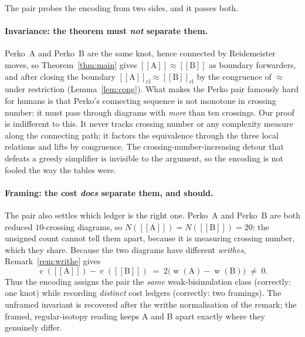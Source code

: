 \documentclass[11pt]{article}
\theoremstyle{definition}
\newcommand{\enc}[1]{[\![ #1 ]\!]}
\newcommand{\wbisim}{\approx}
\newcommand{\writhe}{\operatorname{w}}
\newcommand{\cost}{\operatorname{c}}
\begin{document}
The pair probes the encoding from two sides, and it passes both.

\paragraph{Invariance: the theorem must \emph{not} separate them.}
Perko~A and Perko~B are the same knot, hence connected by Reidemeister moves, so
Theorem~\ref{thm:main} gives $\enc{\text{A}}\wbisim\enc{\text{B}}$ as boundary
forwarders, and after closing the boundary
$\enc{\text{A}}_{\mathrm{cl}}\wbisim\enc{\text{B}}_{\mathrm{cl}}$ by the congruence
of $\wbisim$ under restriction (Lemma~\ref{lem:cong}). What makes the Perko pair
famously hard for humans is that Perko's connecting sequence is not monotone in
crossing number: it must pass through diagrams with \emph{more} than ten
crossings. Our proof is indifferent to this. It never tracks crossing number or
any complexity measure along the connecting path; it factors the equivalence
through the three local relations and lifts by congruence. The
crossing-number-increasing detour that defeats a greedy simplifier is invisible
to the argument, so the encoding is not fooled the way the tables were.

\paragraph{Framing: the cost \emph{does} separate them, and should.}
The pair also settles which ledger is the right one. Perko~A and Perko~B are both
reduced $10$-crossing diagrams, so $N(\enc{\text{A}})=N(\enc{\text{B}})=20$: the
unsigned count cannot tell them apart, because it is measuring crossing number,
which they share. Because the two diagrams have different \emph{writhes},
Remark~\ref{rem:writhe} gives
\[
\cost(\enc{\text{A}}) - \cost(\enc{\text{B}}) \;=\; 2\bigl(\writhe(\text{A})-\writhe(\text{B})\bigr)\;\neq\;0 .
\]
Thus the encoding assigns the pair the \emph{same} weak-bisimulation class
(correctly: one knot) while recording \emph{distinct} cost ledgers (correctly: two
framings). The unframed invariant is recovered after the writhe normalisation of
the remark; the framed, regular-isotopy reading keeps A and B apart exactly where
they genuinely differ.
\end{document}
